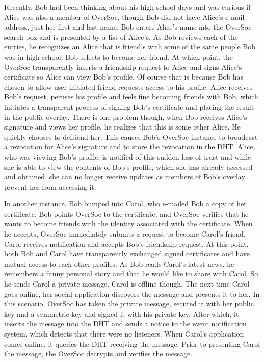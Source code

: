 Recently, Bob had been thinking about his high school days and was curious if
Alice was also a member of OverSoc, though Bob did not have Alice's e-mail
address, just her first and last name.  Bob enters Alice's name into the
OverSoc search box and is presented by a list of Alice's.  As Bob reviews each
of the entries, he recognizes an Alice that is friend's with some of the same
people Bob was in high school.  Bob selects to become her friend.  At which
point, the OverSoc transparently inserts a friendship request to Alice and
signs Alice's certificate so Alice can view Bob's profile.  Of course that is
because Bob has chosen to allow user-initiated friend requests access to his
profile.  Alice receives Bob's request, peruses his profile and feels fine
becoming friends with Bob, which initiates a transparent process of signing
Bob's certificate and placing the result in the public overlay.  There is one
problem though, when Bob receives Alice's signature and views her profile, he
realizes that this is some other Alice.  He quickly chooses to defriend her.
This causes Bob's OverSoc instance to broadcast a revocation for Alice's
signature and to store the revocation in the DHT.  Alice, who was viewing Bob's
profile, is notified of this sudden loss of trust and while she is able to view
the contents of Bob's profile, which she has already accessed and obtained, she
can no longer receive updates as members of Bob's overlay prevent her from
accessing it.

In another instance, Bob bumped into Carol, who e-mailed Bob a copy of her
certificate.  Bob points OverSoc to the certificate, and OverSoc verifies that
he wants to become friends with the identity associated with the certificate.
When he accepts, OverSoc immediately submits a request to become Carol's
friend.  Carol receives notification and accepts Bob's friendship request.  At
this point, both Bob and Carol have transparently exchanged signed certificates
and have mutual access to each other profiles.  As Bob reads Carol's latest
news, he remembers a funny personal story and that he would like to share with
Carol.  So he sends Carol a private message.  Carol is offline though.  The
next time Carol goes online, her social application discovers the message and
presents it to her.  In this scenario, OverSoc  has taken the private message,
secured it with her public key and a symmetric key and signed it with his
private key.  After which, it inserts the message into the DHT and sends a
notice to the event notification system, which detects that there were no
listeners.  When Carol's application comes online, it queries the DHT receiving
the message.  Prior to presenting Carol the message, the OverSoc decrypts and
verifies the message.

